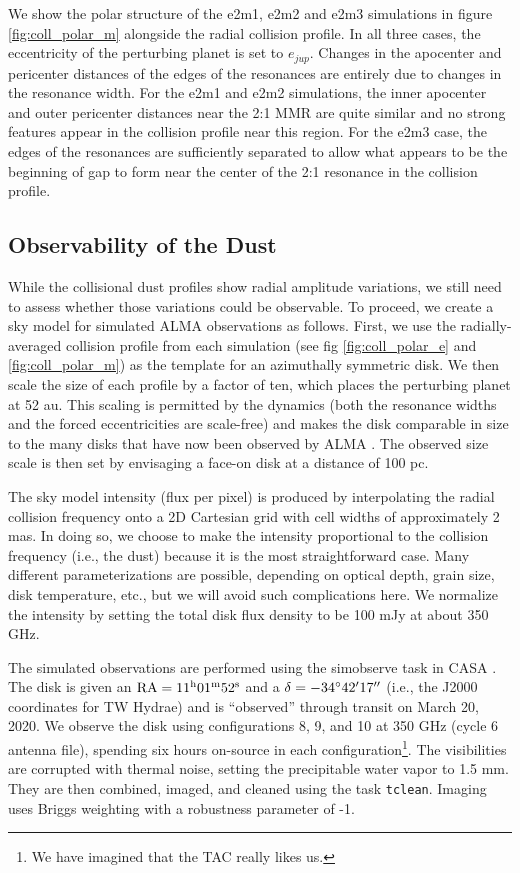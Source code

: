 \documentclass[twocolumn]{aastex63}
\begin{document}
We show the polar structure of the e2m1, e2m2 and e2m3 simulations in figure \ref{fig:coll_polar_m} alongside the radial collision profile. In all three 
cases, the eccentricity of the perturbing planet is set to $e_{jup}$. Changes in the apocenter and pericenter distances of the edges of the 
resonances are entirely due to changes in the resonance width. For the e2m1 and e2m2 simulations, the inner apocenter and outer pericenter 
distances near the 2:1 MMR are quite similar and no strong features appear in the collision profile near this region. For the e2m3 case, the edges of
the resonances are sufficiently separated to allow what appears to be the beginning of gap to form near the center of the 2:1 resonance in the collision profile.

\subsection{Observability of the Dust}

While the collisional dust profiles show radial amplitude variations, we still need to assess whether those variations could be observable. To proceed, 
we create a sky model for simulated ALMA observations as follows. First, we use the radially-averaged collision profile from each simulation (see fig 
\ref{fig:coll_polar_e} and \ref{fig:coll_polar_m}) as the template for an azimuthally symmetric disk. We then scale the size of each profile by a factor of 
ten, which places the perturbing planet at 52 au. This scaling is permitted by the dynamics (both the resonance widths and the forced eccentricities 
are scale-free) and makes the disk comparable in size to the many disks that have now been observed by ALMA \citep{2018ApJ...869L..42H}. The 
observed size scale is then set by envisaging a face-on disk at a distance of 100 pc.  

The sky model intensity (flux per pixel) is produced by interpolating the radial collision frequency onto a 2D Cartesian grid with cell widths of 
approximately 2 mas. In doing so, we choose to make the intensity proportional to the collision frequency (i.e., the dust) because it is the most 
straightforward case. Many different parameterizations are possible, depending on optical depth, grain size, disk temperature, etc., but we will avoid 
such complications here. We normalize the intensity by setting the total disk flux density to be 100 mJy at about 350 GHz.  

The simulated observations are performed using the {simobserve} task in {\sc CASA} \citep{2007ASPC..376..127M}.  The disk is given an 
$\rm RA = 11^{\rm h} 01^{\rm m} 52^{\rm s}$ and a $\delta = -34^\circ 42\mbox{$^\prime$} 17\mbox{$^{\prime\prime}$}$ (i.e., the J2000 coordinates for TW Hydrae) and is 
``observed'' through transit on March 20, 2020. We observe the disk using configurations 8, 9, and 10 at 350 GHz (cycle 6 antenna file), spending six 
hours on-source in each configuration\footnote{We have imagined that the TAC really likes us.}.  The visibilities are corrupted with thermal noise, 
setting the precipitable water vapor to 1.5 mm. They are then combined, imaged, and cleaned
using the task {\tt tclean}. Imaging uses Briggs weighting with a robustness 
parameter of -1. 
\end{document}
